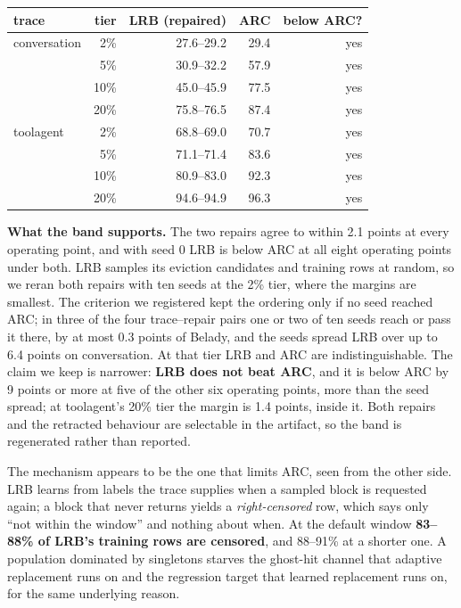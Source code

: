 \begin{center}\small
\begin{tabular}{@{}lrrrr@{}}
\toprule
trace & tier & LRB (repaired) & ARC & below ARC? \\
\midrule
conversation & 2\%  & 27.6--29.2 & 29.4 & yes \\
             & 5\%  & 30.9--32.2 & 57.9 & yes \\
             & 10\% & 45.0--45.9 & 77.5 & yes \\
             & 20\% & 75.8--76.5 & 87.4 & yes \\
\midrule
toolagent    & 2\%  & 68.8--69.0 & 70.7 & yes \\
             & 5\%  & 71.1--71.4 & 83.6 & yes \\
             & 10\% & 80.9--83.0 & 92.3 & yes \\
             & 20\% & 94.6--94.9 & 96.3 & yes \\
\bottomrule
\end{tabular}
\end{center}

\medskip
\noindent \textbf{What the band supports.} The two repairs agree to within 2.1 points at every operating
point, and with seed 0 LRB is below ARC at all eight operating points under both. LRB samples its
eviction candidates and training rows at random, so we reran both repairs with ten seeds at the 2\% tier,
where the margins are smallest. The criterion we registered kept the ordering only if no seed reached ARC;
in three of the four trace--repair pairs one or two of ten seeds reach or pass it there, by at most 0.3
points of Belady, and the seeds spread LRB over up to 6.4 points on conversation. At that tier LRB and ARC are indistinguishable. The
claim we keep is narrower: \textbf{LRB does not beat ARC}, and it is below ARC by 9 points or more at five
of the other six operating points, more than the seed spread; at toolagent's 20\% tier the margin is 1.4
points, inside it. Both repairs and the retracted behaviour are selectable in the
artifact, so the band is regenerated rather than reported.

The mechanism appears to be the one that limits ARC, seen from the other side. LRB learns from labels the
trace supplies when a sampled block is requested again; a block that never returns yields a
\emph{right-censored} row, which says only ``not within the window'' and nothing about when. At the
default window \textbf{83--88\% of LRB's training rows are censored}, and 88--91\% at a shorter one. A
population dominated by singletons starves the ghost-hit channel that adaptive replacement runs on and
the regression target that learned replacement runs on, for the same underlying reason.

